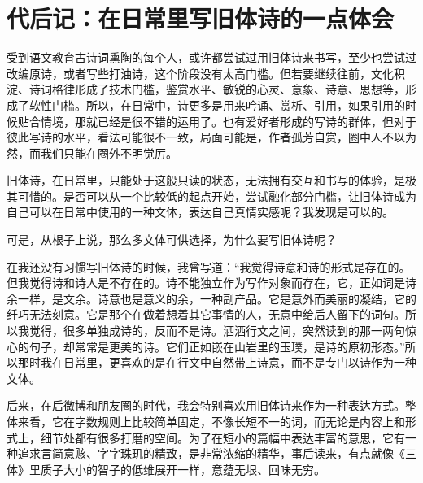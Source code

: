 \documentclass{article}
\begin{document}










\section{代后记：在日常里写旧体诗的一点体会}

受到语文教育古诗词熏陶的每个人，或许都尝试过用旧体诗来书写，至少也尝试过改编原诗，或者写些打油诗，这个阶段没有太高门槛。但若要继续往前，文化积淀、诗词格律形成了技术门槛，鉴赏水平、敏锐的心灵、意象、诗意、思想等，形成了软性门槛。所以，在日常中，诗更多是用来吟诵、赏析、引用，如果引用的时候贴合情境，那就已经是很不错的运用了。也有爱好者形成的写诗的群体，但对于彼此写诗的水平，看法可能很不一致，局面可能是，作者孤芳自赏，圈中人不以为然，而我们只能在圈外不明觉厉。

旧体诗，在日常里，只能处于这般只读的状态，无法拥有交互和书写的体验，是极其可惜的。是否可以从一个比较低的起点开始，尝试融化部分门槛，让旧体诗成为自己可以在日常中使用的一种文体，表达自己真情实感呢？我发现是可以的。

可是，从根子上说，那么多文体可供选择，为什么要写旧体诗呢？

在我还没有习惯写旧体诗的时候，我曾写道：``我觉得诗意和诗的形式是存在的。但我觉得诗和诗人是不存在的。诗不能独立作为写作对象而存在，它，正如词是诗余一样，是文余。诗意也是意义的余，一种副产品。它是意外而美丽的凝结，它的纤巧无法刻意。它是那个在做着想着其它事情的人，无意中给后人留下的词句。所以我觉得，很多单独成诗的，反而不是诗。洒洒行文之间，突然读到的那一两句惊心的句子，却常常是更美的诗。它们正如嵌在山岩里的玉璞，是诗的原初形态。''所以那时我在日常里，更喜欢的是在行文中自然带上诗意，而不是专门以诗作为一种文体。

后来，在后微博和朋友圈的时代，我会特别喜欢用旧体诗来作为一种表达方式。整体来看，它在字数规则上比较简单固定，不像长短不一的词，而无论是内容上和形式上，细节处都有很多打磨的空间。为了在短小的篇幅中表达丰富的意思，它有一种追求言简意赅、字字珠玑的精致，是非常浓缩的精华，事后读来，有点就像《三体》里质子大小的智子的低维展开一样，意蕴无垠、回味无穷。
\end{document}
